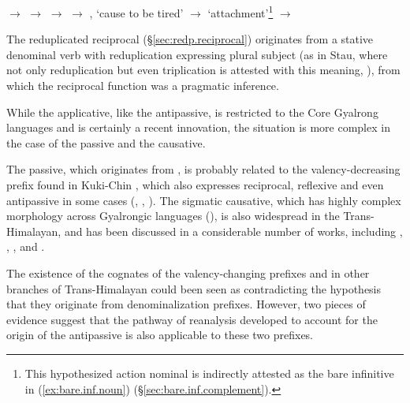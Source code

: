  \begin{exe}
 \ex \label{ex:pathways.denom}
  \begin{xlist}
\ex \label{ex:nWGmu.pathway}
\glt  {} $\rightarrow$  $\rightarrow$   
\ex \label{ex:sWGYat.pathway}
\glt  {} $\rightarrow$  $\rightarrow$ , `cause to be tired'  
\ex \label{ex:atshoR.pathway}
\glt  {}$\rightarrow$  `attachment'\footnote{This hypothesized action nominal is indirectly attested as the bare infinitive in (\ref{ex:bare.inf.noun}) (§\ref{sec:bare.inf.complement}). } $\rightarrow$ 
\end{xlist}
\end{exe}

The reduplicated reciprocal (§\ref{sec:redp.reciprocal}) originates from a stative denominal verb with reduplication expressing plural subject (as in Stau, where not only reduplication but even triplication is attested with this meaning, \citealt{gates17triplication}), from which the reciprocal function was a pragmatic inference.

While the applicative, like the antipassive, is restricted to the Core Gyalrong languages and is certainly a recent innovation, the situation is more complex in the case of the passive and the causative.

The  passive, which originates from , is probably related to the valency-decreasing  prefix found in Kuki-Chin \citep{jacques07passif}, which also expresses reciprocal, reflexive and even antipassive in some cases (\citealt[203--209]{hartmann09grammar}, \citealt[57]{mang06kcho}, \citealt{konnerth21inverse}). The sigmatic causative, which has highly complex morphology across Gyalrongic languages (\citealt{jackson07shangzhai, lai16caus}), is also widespread in the Trans-Himalayan, and has been discussed in a considerable number of works, including \citet{conrady1896}, \citet{sagart12sprefix}, \citet{mei12caus}, \citet{handel12valence} and \citet{jacques15causative}.

The existence of the cognates of the valency-changing prefixes   and  in other branches of Trans-Himalayan could been seen as contradicting the hypothesis that they originate from denominalization prefixes. However, two pieces of evidence suggest that the pathway of reanalysis developed to account for the origin of the antipassive is also applicable to these two prefixes.


